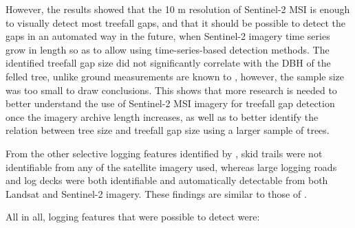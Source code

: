 \documentclass[a4paper,12pt]{scrbook}
\begin{document}
However, the results showed that the 10 m resolution of Sentinel-2 \ac{MSI} is enough to visually detect most treefall gaps, and that it should be possible to detect the gaps in an automated way in the future, when Sentinel-2 imagery time series grow in length so as to allow using time-series-based detection methods. The identified treefall gap size did not significantly correlate with the \ac{DBH} of the felled tree, unlike ground measurements are known to \citep{jackson_area_2002}, however, the sample size was too small to draw conclusions. This shows that more research is needed to better understand the use of Sentinel-2 \ac{MSI} imagery for treefall gap detection once the imagery archive length increases, as well as to better identify the relation between tree size and treefall gap size using a larger sample of trees.

From the other selective logging features identified by \citet{asner_remote_2002}, skid trails were not identifiable from any of the satellite imagery used, whereas large logging roads and log decks were both identifiable and automatically detectable from both Landsat and Sentinel-2 imagery. These findings are similar to those of \citet{read_spatial_2003}.

All in all, logging features that were possible to detect were:
\end{document}
